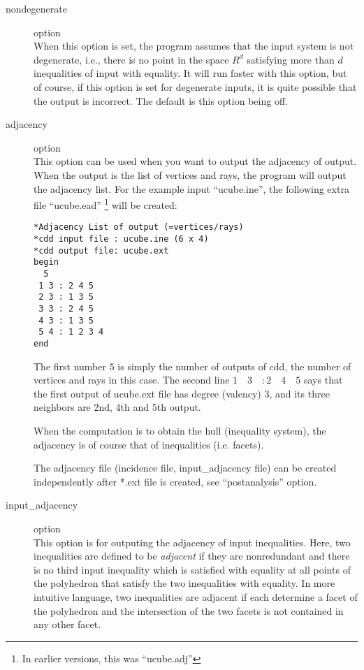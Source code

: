 \documentclass[11pt]{article}
\begin{document}
\begin{description}
\item[nondegenerate] option\\
When this option is set, the program assumes that the input system
is not degenerate, i.e., there is no point in the space $R^d$ satisfying
more than $d$ inequalities of input with equality.
It will run faster with this option, but of course, 
if this option is set for degenerate inputs, it is 
quite possible that the output is incorrect.  
The default is this option being off.

\item[adjacency] option\\
This option can be used when you want to output the adjacency of output.
When the output is the list of vertices and rays, the program will
output the adjacency list.  For the example input ``ucube.ine'',
the following extra file  ``ucube.ead''  \footnote{In earlier versions,
this was ``ucube.adj''}  will be created:
\begin{verbatim}
*Adjacency List of output (=vertices/rays)
*cdd input file : ucube.ine (6 x 4)
*cdd output file: ucube.ext
begin
  5
 1 3 : 2 4 5
 2 3 : 1 3 5
 3 3 : 2 4 5
 4 3 : 1 3 5
 5 4 : 1 2 3 4
end
\end{verbatim}
The first number $5$ is simply the number of outputs of cdd, the
number of vertices and rays in this case.
The second line $ 1 \quad  3 \quad : 2 \quad  4 \quad  5$ says 
that the first output of
ucube.ext file has degree (valency) $3$, and its three neighbors are
2nd, 4th and 5th output.

When the computation is to obtain the hull (inequality system),
the adjacency is of course that of inequalities (i.e. facets).

The adjacency file (incidence file, input\_adjacency file) 
can be created independently
after *.ext file is created, see ``postanalysis'' option.

\item[input\_adjacency] option\\
This option is for outputing the adjacency of input inequalities.
Here, two inequalities are defined to be {\em adjacent\/} if 
they are nonredundant and there is no third input inequality
which is satisfied with equality at all points of the polyhedron
that satisfy the two inequalities with equality. 
In more intuitive language, two inequalities are adjacent
if each determine a facet of the polyhedron and the intersection
of the two facets is not contained in any other facet.


\end{description}
\end{document}
